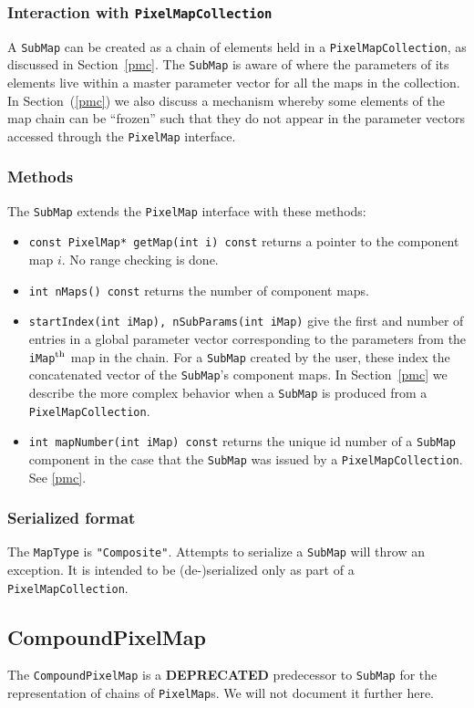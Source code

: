 \documentclass[11pt,preprint,flushrt]{aastex}
\begin{document}
\subsubsection{Interaction with {\tt PixelMapCollection}}
A {\tt SubMap} can be created as a chain of elements held in a {\tt PixelMapCollection}, as discussed in Section~\ref{pmc}.  The {\tt SubMap} is aware of where the parameters of its elements live within a master parameter vector for all the maps in the collection.  In Section~(\ref{pmc}) we also discuss a mechanism whereby some elements of the map chain can be ``frozen'' such that they do not appear in the parameter vectors accessed through the {\tt PixelMap} interface.

\subsubsection{Methods}
The {\tt SubMap} extends the {\tt PixelMap} interface with these methods:
\begin{itemize}
\item {\tt const PixelMap* getMap(int i) const} returns a pointer to the component map $i$.  No range checking is done.
\item {\tt int nMaps() const} returns the number of component maps.
\item {\tt startIndex(int iMap), nSubParams(int iMap)} give the first and number of entries in a global parameter vector corresponding to the parameters from the {\tt iMap}$^{\rm th}$ map in the chain.  For a {\tt SubMap} created by the user, these index the concatenated vector of the {\tt SubMap}'s component maps.  In Section~\ref{pmc} we describe the more complex behavior when a {\tt SubMap} is produced from a {\tt PixelMapCollection}.
\item {\tt int mapNumber(int iMap) const} returns the unique id number of a {\tt SubMap} component in the case that the {\tt SubMap} was issued by a {\tt PixelMapCollection}.  See \ref{pmc}.
\end{itemize}

\subsubsection{Serialized format}
The {\tt MapType} is {\tt "Composite"}.
Attempts to serialize a {\tt SubMap} will throw an exception.  It is intended to be (de-)serialized only as part of a {\tt PixelMapCollection}.

\subsection{CompoundPixelMap}
The {\tt CompoundPixelMap} is a {\bf DEPRECATED} predecessor to {\tt SubMap} for the representation of chains of {\tt PixelMap}s.  We will not document it further here.
\end{document}
